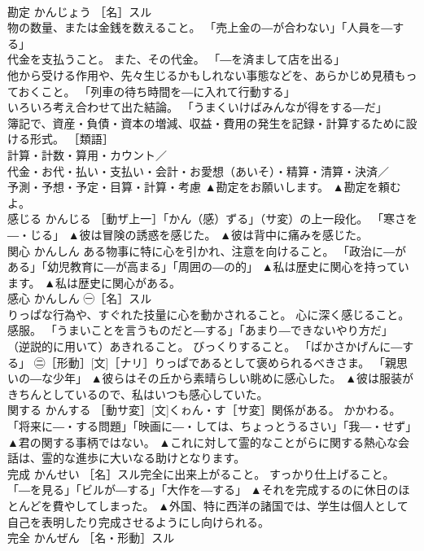 \documentclass[8pt]{extreport}
\begin{document}
\begin{CJK}{UTF8}{min}
\\	勘定	かんじょう	［名］スル 
\\	物の数量、または金銭を数えること。 「売上金の―が合わない」「人員を―する」 
\\	代金を支払うこと。 また、その代金。 「―を済まして店を出る」 
\\	他から受ける作用や、先々生じるかもしれない事態などを、あらかじめ見積もっておくこと。 「列車の待ち時間を―に入れて行動する」 
\\	いろいろ考え合わせて出た結論。 「うまくいけばみんなが得をする―だ」 
\\	簿記で、資産・負債・資本の増減、収益・費用の発生を記録・計算するために設ける形式。 ［類語］
\\	計算・計数・算用・カウント／
\\	代金・お代・払い・支払い・会計・お愛想（あいそ）・精算・清算・決済／
\\	予測・予想・予定・目算・計算・考慮	▲勘定をお願いします。 ▲勘定を頼むよ。
\\	感じる	かんじる	［動ザ上一］「かん（感）ずる」（サ変）の上一段化。 「寒さを―・じる」	▲彼は冒険の誘惑を感じた。 ▲彼は背中に痛みを感じた。
\\	関心	かんしん	ある物事に特に心を引かれ、注意を向けること。 「政治に―がある」「幼児教育に―が高まる」「周囲の―の的」	▲私は歴史に関心を持っています。 ▲私は歴史に関心がある。
\\	感心	かんしん	㊀［名］スル　 
\\	りっぱな行為や、すぐれた技量に心を動かされること。 心に深く感じること。 感服。 「うまいことを言うものだと―する」「あまり―できないやり方だ」 
\\	（逆説的に用いて）あきれること。 びっくりすること。 「ばかさかげんに―する」 ㊁［形動］[文]［ナリ］りっぱであるとして褒められるべきさま。 「親思いの―な少年」	▲彼らはその丘から素晴らしい眺めに感心した。 ▲彼は服装がきちんとしているので、私はいつも感心していた。
\\	関する	かんする	［動サ変］[文]くゎん・す［サ変］関係がある。 かかわる。 「将来に―・する問題」「映画に―・しては、ちょっとうるさい」「我―・せず」	▲君の関する事柄ではない。 ▲これに対して霊的なことがらに関する熱心な会話は、霊的な進歩に大いなる助けとなります。
\\	完成	かんせい	［名］スル完全に出来上がること。 すっかり仕上げること。 「―を見る」「ビルが―する」「大作を―する」	▲それを完成するのに休日のほとんどを費やしてしまった。 ▲外国、特に西洋の諸国では、学生は個人として自己を表明したり完成させるようにし向けられる。
\\	完全	かんぜん	［名・形動］スル 

\end{CJK}
\end{document}
